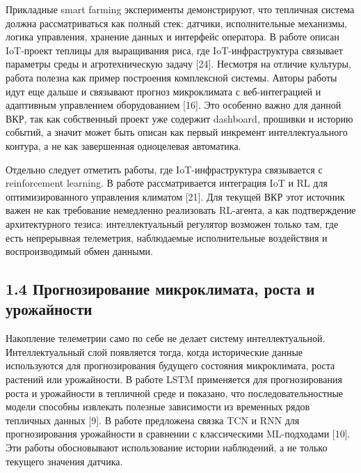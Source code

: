 \documentclass[a4paper,14pt]{extarticle}
\begin{document}
Прикладные smart farming эксперименты демонстрируют, что тепличная
система должна рассматриваться как полный стек: датчики, исполнительные
механизмы, логика управления, хранение данных и интерфейс оператора. В
работе описан IoT-проект теплицы для выращивания риса, где
IoT-инфраструктура связывает параметры среды и агротехническую задачу
{[}24{]}. Несмотря на отличие культуры, работа полезна как пример
построения комплексной системы. Авторы работы идут еще дальше и
связывают прогноз микроклимата с веб-интеграцией и адаптивным
управлением оборудованием {[}16{]}. Это особенно важно для данной ВКР,
так как собственный проект уже содержит dashboard, прошивки и историю
событий, а значит может быть описан как первый инкремент
интеллектуального контура, а не как завершенная одноцелевая автоматика.

Отдельно следует отметить работы, где IoT-инфраструктура связывается с
reinforcement learning. В работе рассматривается интеграция IoT и RL для
оптимизированного управления климатом {[}21{]}. Для текущей ВКР этот
источник важен не как требование немедленно реализовать RL-агента, а как
подтверждение архитектурного тезиса: интеллектуальный регулятор возможен
только там, где есть непрерывная телеметрия, наблюдаемые исполнительные
воздействия и воспроизводимый обмен данными.

\hypertarget{ux43fux440ux43eux433ux43dux43eux437ux438ux440ux43eux432ux430ux43dux438ux435-ux43cux438ux43aux440ux43eux43aux43bux438ux43cux430ux442ux430-ux440ux43eux441ux442ux430-ux438-ux443ux440ux43eux436ux430ux439ux43dux43eux441ux442ux438}{%
\subsection{1.4 Прогнозирование микроклимата, роста и
урожайности}\label{ux43fux440ux43eux433ux43dux43eux437ux438ux440ux43eux432ux430ux43dux438ux435-ux43cux438ux43aux440ux43eux43aux43bux438ux43cux430ux442ux430-ux440ux43eux441ux442ux430-ux438-ux443ux440ux43eux436ux430ux439ux43dux43eux441ux442ux438}}

Накопление телеметрии само по себе не делает систему интеллектуальной.
Интеллектуальный слой появляется тогда, когда исторические данные
используются для прогнозирования будущего состояния микроклимата, роста
растений или урожайности. В работе LSTM применяется для прогнозирования
роста и урожайности в тепличной среде и показано, что
последовательностные модели способны извлекать полезные зависимости из
временных рядов тепличных данных {[}9{]}. В работе предложена связка TCN
и RNN для прогнозирования урожайности в сравнении с классическими
ML-подходами {[}10{]}. Эти работы обосновывают использование истории
наблюдений, а не только текущего значения датчика.
\end{document}
